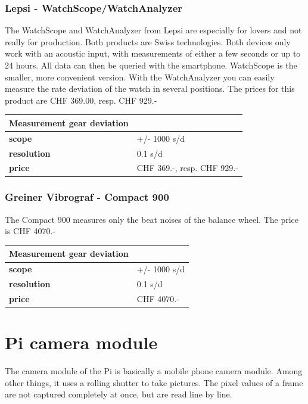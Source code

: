 \documentclass[12pt, a4paper]{report}
\begin{document}
    \subsubsection{Lepsi - WatchScope/WatchAnalyzer}
    The WatchScope and WatchAnalyzer from Lepsi are especially for lovers and not really for production. Both products are Swiss technologies. Both devices only work with an acoustic input, with measurements of either a few seconds or up to 24 hours. All data can then be queried with the smartphone. WatchScope is the smaller, more convenient version. With the WatchAnalyzer you can easily measure the rate deviation of the watch in several positions. The prices for this product are CHF 369.00, resp. CHF 929.-
    
    \bigskip
    
    \begin{tabularx}{\textwidth}{>{\bfseries}lX}
    Measurement gear deviation & \\\toprule
    scope & +/- 1000 s/d \\\midrule
    resolution & 0.1 s/d\\\midrule
    price & CHF 369.-, resp. CHF 929.-\\\bottomrule
    \end{tabularx}
    
    
    \subsubsection{Greiner Vibrograf - Compact 900}
    The Compact 900 measures only the beat noises of the balance wheel. The price is CHF 4070.-
    
    \bigskip
    
    \begin{tabularx}{\textwidth}{>{\bfseries}lX}
    Measurement gear deviation & \\\toprule
    scope & +/- 1000 s/d \\\midrule
    resolution & 0.1 s/d\\\midrule
    price & CHF 4070.-\\\bottomrule
    \end{tabularx}
    
    \section{Pi camera module}
    
    The camera module of the Pi is basically a mobile phone camera module. Among other things, it uses a rolling shutter to take pictures. The pixel values of a frame are not captured completely at once, but are read line by line.
    
\end{document}

